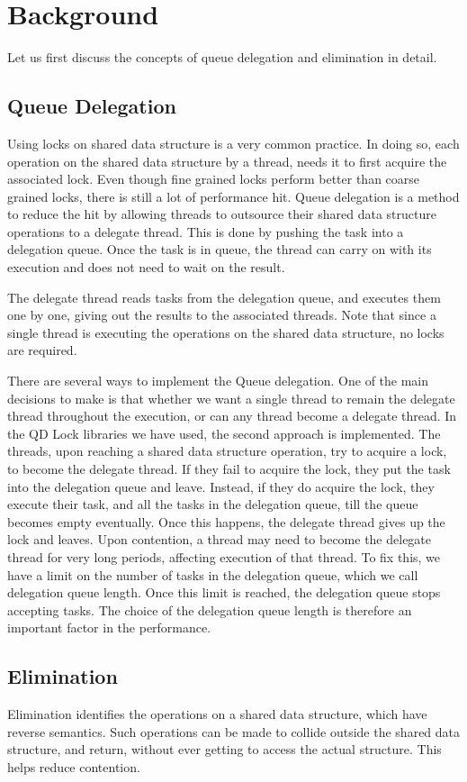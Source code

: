 \section{Background}
Let us first discuss the concepts of queue delegation and elimination in detail.
\subsection{Queue Delegation}
Using locks on shared data structure is a very common practice. In doing so, each operation on the shared data structure by a thread, needs it to first acquire the associated lock. Even though fine grained locks perform better than coarse grained locks, there is still a lot of performance hit. Queue delegation is a method to reduce the hit by allowing threads to outsource their shared data structure operations to a delegate thread. This is done by pushing the task into a delegation queue. Once the task is in queue, the thread can carry on with its execution and does not need to wait on the result.

The delegate thread reads tasks from the delegation queue, and executes them one by one, giving out the results to the associated threads. Note that since a single thread is executing the operations on the shared data structure, no locks are required.

There are several ways to implement the Queue delegation. One of the main decisions to make is that whether we want a single thread to remain the delegate thread throughout the execution, or can any thread become a delegate thread. In the QD Lock libraries we have used, the second approach is implemented. The threads, upon reaching a shared data structure operation, try to acquire a lock, to become the delegate thread. If they fail to acquire the lock, they put the task into the delegation queue and leave. Instead, if they do acquire the lock, they execute their task, and all the tasks in the delegation queue, till the queue becomes empty eventually. Once this happens, the delegate thread gives up the lock and leaves. Upon contention, a thread may need to become the delegate thread for very long periods, affecting execution of that thread. To fix this, we have a limit on the number of tasks in the delegation queue, which we call delegation queue length. Once this limit is reached, the delegation queue stops accepting tasks. The choice of the delegation queue length is therefore an important factor in the performance.

\subsection{Elimination}
Elimination identifies the operations on a shared data structure, which have reverse semantics. Such operations can be made to collide outside the shared data structure, and return, without ever getting to access the actual structure. This helps  reduce contention. 

